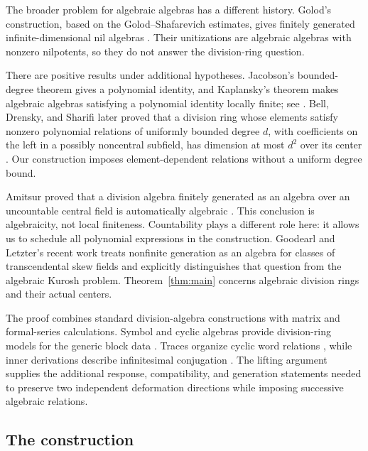 \documentclass[11pt]{article}
\theoremstyle{definition}
\theoremstyle{remark}
\numberwithin{equation}{section}
\begin{document}
The broader problem for algebraic algebras has a different history.
Golod's construction, based on the Golod--Shafarevich estimates, gives
finitely generated infinite-dimensional nil algebras
\cite[Example~1]{Golod1964}. Their unitizations are algebraic algebras
with nonzero nilpotents, so they do not answer the division-ring question.

There are positive results under additional hypotheses. Jacobson's
bounded-degree theorem gives a polynomial identity, and Kaplansky's
theorem makes algebraic algebras satisfying a polynomial identity
locally finite; see \cite[Theorems~3 and~5]{Jacobson1952}.
Bell, Drensky, and Sharifi later proved that a division ring whose
elements satisfy nonzero polynomial relations of uniformly bounded degree $d$,
with coefficients on the left in a possibly noncentral subfield, has
dimension at most $d^2$ over its center
\cite[Theorem~1.3]{BellDrenskySharifi2013}. Our construction imposes
element-dependent relations without a uniform degree bound.

Amitsur proved that a division algebra finitely generated as an algebra
over an uncountable central field is automatically algebraic
\cite[Corollary~$2'$]{Amitsur1956}. This conclusion is algebraicity,
not local finiteness. Countability plays a different role here: it
allows us to schedule all polynomial expressions in the construction.
Goodearl and Letzter's recent work \cite{GoodearlLetzter2026} treats
nonfinite generation as an algebra for classes of transcendental skew
fields and explicitly distinguishes that question from the algebraic
Kurosh problem. Theorem~\ref{thm:main} concerns algebraic division rings
and their actual centers.

The proof combines standard division-algebra constructions with matrix
and formal-series calculations. Symbol and cyclic algebras provide
division-ring models for the generic block data
\cite[Section~2.5]{GilleSzamuely2006}. Traces organize cyclic word
relations \cite[Section~4]{Procesi1976}, while inner derivations describe
infinitesimal conjugation \cite[Theorem~8]{Jacobson1937Derivations}.
The lifting argument supplies the additional response, compatibility,
and generation statements needed to preserve two independent deformation
directions while imposing successive algebraic relations.

\subsection{The construction}
\end{document}
